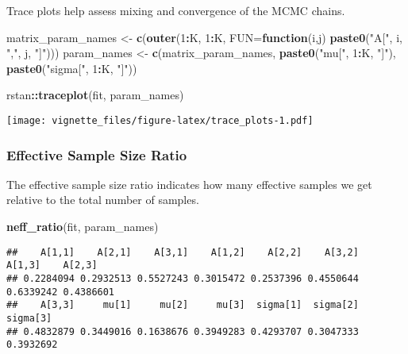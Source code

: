 \documentclass[
]{article}
\newenvironment{Shaded}{\begin{snugshade}}{\end{snugshade}}
\newcommand{\AttributeTok}[1]{\textcolor[rgb]{0.13,0.29,0.53}{#1}}
\newcommand{\ControlFlowTok}[1]{\textcolor[rgb]{0.13,0.29,0.53}{\textbf{#1}}}
\newcommand{\DecValTok}[1]{\textcolor[rgb]{0.00,0.00,0.81}{#1}}
\newcommand{\FunctionTok}[1]{\textcolor[rgb]{0.13,0.29,0.53}{\textbf{#1}}}
\newcommand{\NormalTok}[1]{#1}
\newcommand{\OtherTok}[1]{\textcolor[rgb]{0.56,0.35,0.01}{#1}}
\newcommand{\SpecialCharTok}[1]{\textcolor[rgb]{0.81,0.36,0.00}{\textbf{#1}}}
\newcommand{\StringTok}[1]{\textcolor[rgb]{0.31,0.60,0.02}{#1}}
\begin{document}
Trace plots help assess mixing and convergence of the MCMC chains.

\begin{Shaded}
\begin{Highlighting}[]
\NormalTok{matrix\_param\_names }\OtherTok{\textless{}{-}} \FunctionTok{c}\NormalTok{(}\FunctionTok{outer}\NormalTok{(}\DecValTok{1}\SpecialCharTok{:}\NormalTok{K, }\DecValTok{1}\SpecialCharTok{:}\NormalTok{K, }\AttributeTok{FUN=}\ControlFlowTok{function}\NormalTok{(i,j) }\FunctionTok{paste0}\NormalTok{(}\StringTok{"A["}\NormalTok{, i, }\StringTok{","}\NormalTok{, j, }\StringTok{"]"}\NormalTok{)))}
\NormalTok{param\_names }\OtherTok{\textless{}{-}} \FunctionTok{c}\NormalTok{(matrix\_param\_names,}
                \FunctionTok{paste0}\NormalTok{(}\StringTok{"mu["}\NormalTok{, }\DecValTok{1}\SpecialCharTok{:}\NormalTok{K, }\StringTok{"]"}\NormalTok{),}
                \FunctionTok{paste0}\NormalTok{(}\StringTok{"sigma["}\NormalTok{, }\DecValTok{1}\SpecialCharTok{:}\NormalTok{K, }\StringTok{"]"}\NormalTok{))}

\NormalTok{rstan}\SpecialCharTok{::}\FunctionTok{traceplot}\NormalTok{(fit, param\_names)}
\end{Highlighting}
\end{Shaded}

\texttt{[image: vignette\_files/figure-latex/trace\_plots-1.pdf]}

\subsubsection{Effective Sample Size
Ratio}\label{effective-sample-size-ratio}

The effective sample size ratio indicates how many effective samples we
get relative to the total number of samples.

\begin{Shaded}
\begin{Highlighting}[]
\FunctionTok{neff\_ratio}\NormalTok{(fit, param\_names)}
\end{Highlighting}
\end{Shaded}

\begin{verbatim}
##    A[1,1]    A[2,1]    A[3,1]    A[1,2]    A[2,2]    A[3,2]    A[1,3]    A[2,3] 
## 0.2284094 0.2932513 0.5527243 0.3015472 0.2537396 0.4550644 0.6339242 0.4386601 
##    A[3,3]     mu[1]     mu[2]     mu[3]  sigma[1]  sigma[2]  sigma[3] 
## 0.4832879 0.3449016 0.1638676 0.3949283 0.4293707 0.3047333 0.3932692
\end{verbatim}
\end{document}
